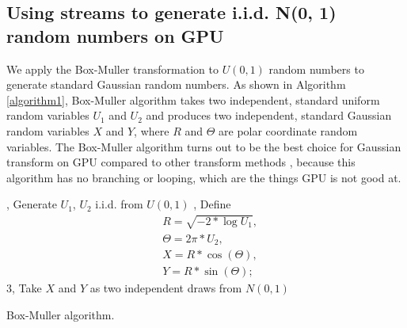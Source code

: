 \documentclass[article,nojss]{jss}\usepackage[]{graphicx}\usepackage[]{color}
\begin{document}
\subsection{Using streams to generate i.i.d. N(0, 1) random numbers on GPU}
We apply the Box-Muller transformation to $U(0,1)$ random numbers to generate standard Gaussian random numbers. As shown in Algorithm \ref{algorithm1}, Box-Muller algorithm takes two independent, standard uniform random variables $U_1$ and $U_2$ and produces two independent, standard Gaussian random variables $X$ and $Y$, where $R$ and $\Theta$ are polar coordinate random variables. %
The Box-Muller algorithm turns out to be the best choice for Gaussian transform on GPU compared to other transform methods \citep{howes2007efficient}, because this algorithm has no branching or looping, which are the things GPU is not good at. %

\begin{algorithm*}[H] \label{algorithm1}
, Generate $U_1$, $U_2$ i.i.d. from $U (0,1)$ , Define \begin{align*} 
& R = \sqrt{-2*\log U_1},\\
&  \Theta = 2\pi*U_2,\\
&  X=R*\cos(\Theta),\\
& Y=R*\sin(\Theta);\;\end{align*}
 3, Take $X$ and $Y$ as two independent draws from $N(0,1)$\;
 \caption{Box-Muller algorithm.}
\end{algorithm*}
\end{document}
